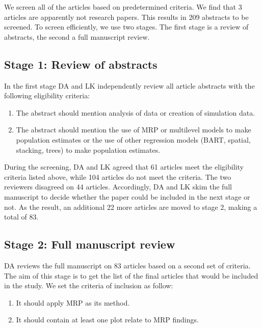 \documentclass{monashthesis}
\begin{document}
We screen all of the articles based on predetermined criteria. We find that 3 articles are apparently not research papers. This results in 209 abstracts to be screened. To screen efficiently, we use two stages. The first stage is a review of abstracts, the second a full manuscript review.

\hypertarget{stage-1-review-of-abstracts}{%
\subsection{Stage 1: Review of abstracts}\label{stage-1-review-of-abstracts}}

In the first stage DA and LK independently review all article abstracts with the following eligibility criteria:

\begin{enumerate}
\def\labelenumi{\arabic{enumi}.}
\tightlist
\item
  The abstract should mention analysis of data or creation of simulation data.
\item
  The abstract should mention the use of MRP or multilevel models to make population estimates or the use of other regression models (BART, spatial, stacking, trees) to make population estimates.
\end{enumerate}

During the screening, DA and LK agreed that 61 articles meet the eligibility criteria listed above, while 104 articles do not meet the criteria. The two reviewers disagreed on 44 articles. Accordingly, DA and LK skim the full manuscript to decide whether the paper could be included in the next stage or not. As the result, an additional 22 more articles are moved to stage 2, making a total of 83.

\hypertarget{stage-2-full-manuscript-review}{%
\subsection{Stage 2: Full manuscript review}\label{stage-2-full-manuscript-review}}

DA reviews the full manuscript on 83 articles based on a second set of criteria. The aim of this stage is to get the list of the final articles that would be included in the study. We set the criteria of inclusion as follow:

\begin{enumerate}
\def\labelenumi{\arabic{enumi}.}
\tightlist
\item
  It should apply MRP as its method.
\item
  It should contain at least one plot relate to MRP findings.
\end{enumerate}
\end{document}
